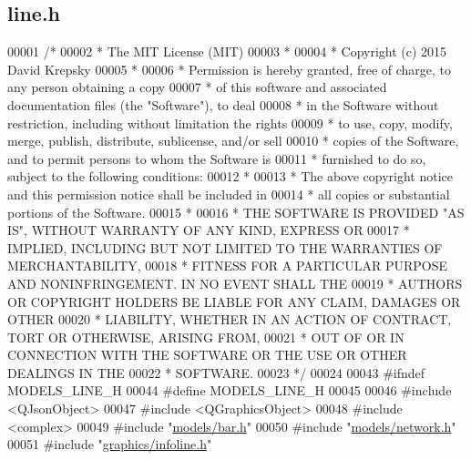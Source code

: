 \hypertarget{line_8h_source}{}\subsection{line.\+h}
\label{line_8h_source}

\begin{DoxyCode}
00001 \textcolor{comment}{/*}
00002 \textcolor{comment}{ * The MIT License (MIT)}
00003 \textcolor{comment}{ *}
00004 \textcolor{comment}{ * Copyright (c) 2015 David Krepsky}
00005 \textcolor{comment}{ *}
00006 \textcolor{comment}{ * Permission is hereby granted, free of charge, to any person obtaining a copy}
00007 \textcolor{comment}{ * of this software and associated documentation files (the "Software"), to deal}
00008 \textcolor{comment}{ * in the Software without restriction, including without limitation the rights}
00009 \textcolor{comment}{ * to use, copy, modify, merge, publish, distribute, sublicense, and/or sell}
00010 \textcolor{comment}{ * copies of the Software, and to permit persons to whom the Software is}
00011 \textcolor{comment}{ * furnished to do so, subject to the following conditions:}
00012 \textcolor{comment}{ *}
00013 \textcolor{comment}{ * The above copyright notice and this permission notice shall be included in}
00014 \textcolor{comment}{ * all copies or substantial portions of the Software.}
00015 \textcolor{comment}{ *}
00016 \textcolor{comment}{ * THE SOFTWARE IS PROVIDED "AS IS", WITHOUT WARRANTY OF ANY KIND, EXPRESS OR}
00017 \textcolor{comment}{ * IMPLIED, INCLUDING BUT NOT LIMITED TO THE WARRANTIES OF MERCHANTABILITY,}
00018 \textcolor{comment}{ * FITNESS FOR A PARTICULAR PURPOSE AND NONINFRINGEMENT. IN NO EVENT SHALL THE}
00019 \textcolor{comment}{ * AUTHORS OR COPYRIGHT HOLDERS BE LIABLE FOR ANY CLAIM, DAMAGES OR OTHER}
00020 \textcolor{comment}{ * LIABILITY, WHETHER IN AN ACTION OF CONTRACT, TORT OR OTHERWISE, ARISING FROM,}
00021 \textcolor{comment}{ * OUT OF OR IN CONNECTION WITH THE SOFTWARE OR THE USE OR OTHER DEALINGS IN THE}
00022 \textcolor{comment}{ * SOFTWARE.}
00023 \textcolor{comment}{ */}
00024 
00043 \textcolor{preprocessor}{#ifndef MODELS\_LINE\_H}
00044 \textcolor{preprocessor}{#define MODELS\_LINE\_H}
00045 
00046 \textcolor{preprocessor}{#include <QJsonObject>}
00047 \textcolor{preprocessor}{#include <QGraphicsObject>}
00048 \textcolor{preprocessor}{#include <complex>}
00049 \textcolor{preprocessor}{#include "\hyperlink{bar_8h}{models/bar.h}"}
00050 \textcolor{preprocessor}{#include "\hyperlink{network_8h}{models/network.h}"}
00051 \textcolor{preprocessor}{#include "\hyperlink{infoline_8h}{graphics/infoline.h}"}

\end{DoxyCode}

